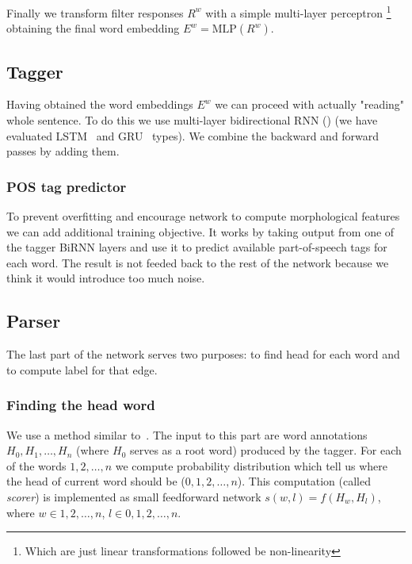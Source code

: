 Finally we transform filter responses $R^w$ with a simple multi-layer perceptron
\footnote{Which are just linear transformations followed be non-linearity}
obtaining the final word embedding $E^w = \text{MLP}(R^w)$.

\subsection{Tagger}
\begin{sloppypar}
Having obtained the word embeddings $E^w$ we can proceed with actually "reading"
whole sentence. To do this we use multi-layer bidirectional RNN (\cite{schuster_bidirectional_1997})
(we have evaluated LSTM~\cite{RNN_LSTM} and GRU~\cite{RNN_GRU} types). We combine
the backward and forward passes by adding them.
\end{sloppypar}

\subsubsection{POS tag predictor}
To prevent overfitting and encourage network to compute morphological features
we can add additional training objective. It works by taking output from one of
the tagger BiRNN layers and use it to predict available part-of-speech tags for
each word. The result is not feeded back to the rest of the network because we
think it would introduce too much noise.

\subsection{Parser}
The last part of the network serves two purposes: to find head for each word and
to compute label for that edge.

\subsubsection{Finding the head word}
We use a method similar to~\cite{vinyals_pointer_2015}.
The input to this part are word annotations $H_0, H_1, \dots, H_n$ (where $H_0$
serves as a root word) produced by the tagger. For each of the words $1,2,\dots,n$
we compute probability distribution which tell us where the head of current
word should be ($0,1,2,\dots,n$). This computation (called \emph{scorer}) is implemented
as small feedforward network $s(w,l) = f(H_w, H_l)$, where $w \in {1,2,\dots,n}$,
$l \in {0,1,2,\dots,n}$.

